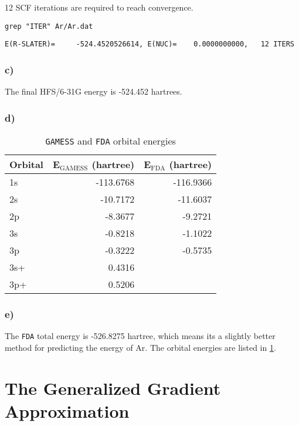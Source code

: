 \documentclass[11pt]{article}
\begin{document}
12 SCF iterations are required to reach convergence.

\begin{verbatim}
grep "ITER" Ar/Ar.dat
\end{verbatim}

\begin{verbatim}
E(R-SLATER)=     -524.4520526614, E(NUC)=    0.0000000000,   12 ITERS
\end{verbatim}


\subsubsection{c)}
\label{sec-1-1-3}

The final HFS/6-31G energy is -524.452  hartrees.

\subsubsection{d)}
\label{sec-1-1-4}

\begin{table}[htb]
\caption{\texttt{GAMESS} and \texttt{FDA} orbital energies \label{orbital-energies}}
\centering
\begin{tabular}{lrr}
Orbital & E$_{\text{GAMESS}}$ (hartree) & E$_{\text{FDA}}$ (hartree)\\
\hline
1s & -113.6768 & -116.9366\\
2s & -10.7172 & -11.6037\\
2p & -8.3677 & -9.2721\\
3s & -0.8218 & -1.1022\\
3p & -0.3222 & -0.5735\\
3s+ & 0.4316 & \\
3p+ & 0.5206 & \\
\end{tabular}
\end{table}


\subsubsection{e)}
\label{sec-1-1-5}

The \texttt{FDA} total energy is -526.8275 hartree, which means its a slightly better method for predicting the energy of Ar. The orbital energies are listed in \ref{orbital-energies}. 

\section{The Generalized Gradient Approximation}
\label{sec-2}
\end{document}
